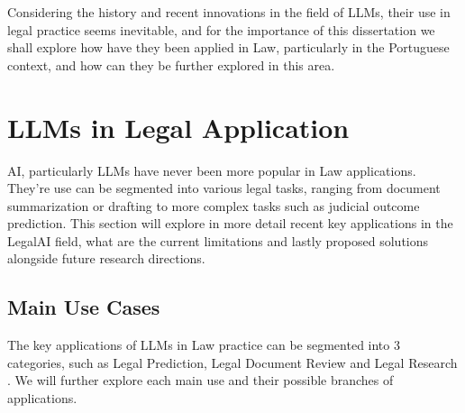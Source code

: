 \documentclass[11pt,a4paper,twoside,openright]{book}
\begin{document}
\par Considering the history and recent innovations in the field of LLMs, their use in legal practice seems inevitable, and for the importance of this dissertation we shall explore how have they been applied in Law, particularly in the Portuguese context, and how can they be further explored in this area.
















\section{LLMs in Legal Application}

AI, particularly LLMs have never been more popular in Law applications. They're use can be segmented into various legal tasks, ranging from document summarization or drafting to more complex tasks such as judicial outcome prediction. This section will explore in more detail recent key applications in the LegalAI field, what are the current limitations and lastly proposed solutions alongside future research directions.

\subsection{Main Use Cases}
The key applications of LLMs in Law practice can be segmented into 3 categories, such as Legal Prediction, Legal Document Review and Legal Research \parencite{siino_Lit_review_LLMs_2025}. We will further explore each main use and their possible branches of applications.
\end{document}
